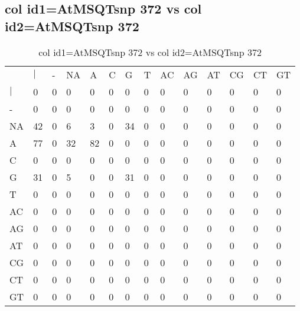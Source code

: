 \subsection{col id1=AtMSQTsnp 372 vs col id2=AtMSQTsnp 372}
\begin{center}
\begin{longtable}{|l|l|l|l|l|l|l|l|l|l|l|l|l|l|}
\caption{col id1=AtMSQTsnp 372 vs col id2=AtMSQTsnp 372} \label{table_dm890}\\
\hline
\\
\hline
&$|$&-&NA&A&C&G&T&AC&AG&AT&CG&CT&GT\\
$|$&0&0&0&0&0&0&0&0&0&0&0&0&0\\
-&0&0&0&0&0&0&0&0&0&0&0&0&0\\
NA&42&0&6&3&0&34&0&0&0&0&0&0&0\\
A&77&0&32&82&0&0&0&0&0&0&0&0&0\\
C&0&0&0&0&0&0&0&0&0&0&0&0&0\\
G&31&0&5&0&0&31&0&0&0&0&0&0&0\\
T&0&0&0&0&0&0&0&0&0&0&0&0&0\\
AC&0&0&0&0&0&0&0&0&0&0&0&0&0\\
AG&0&0&0&0&0&0&0&0&0&0&0&0&0\\
AT&0&0&0&0&0&0&0&0&0&0&0&0&0\\
CG&0&0&0&0&0&0&0&0&0&0&0&0&0\\
CT&0&0&0&0&0&0&0&0&0&0&0&0&0\\
GT&0&0&0&0&0&0&0&0&0&0&0&0&0\\
\hline
\end{longtable}
\end{center}

